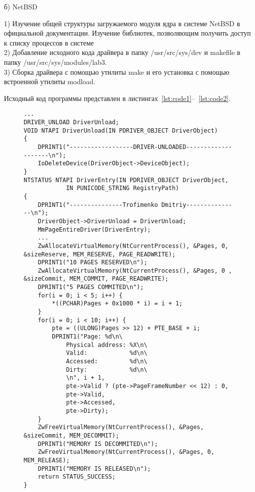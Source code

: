 \documentclass[a4paper, 14pt]{extarticle}
\begin{document}
\begin{center}
б) NetBSD
\end{center}
1) Изучение общей структуры загружаемого модуля ядра в системе
NetBSD в официальной документации. Изучение библиотек,
позволяющим получить доступ к списку процессов в системе\\
2) Добавление исходного кода драйвера в папку /usr/src/sys/dev и
makefile в папку /usr/src/sys/modules/lab3.\\
3) Сборка драйвера с помощью утилиты make и его установка с
помощью встроенной утилиты modload.\\

\newpage

Исходный код программы представлен в листингах~\ref{lst:code1}--~\ref{lst:code2}.
\begin{figure}[!htb]
\begin{lstlisting}[language={},caption={
lab4driver.c (ReactOS).},label={lst:code1}]
...
DRIVER_UNLOAD DriverUnload;
VOID NTAPI DriverUnload(IN PDRIVER_OBJECT DriverObject)
{
    DPRINT1("------------------DRIVER-UNLOADED--------------------\n");
    IoDeleteDevice(DriverObject->DeviceObject);
}
NTSTATUS NTAPI DriverEntry(IN PDRIVER_OBJECT DriverObject,
            IN PUNICODE_STRING RegistryPath)
{
    DPRINT1("---------------Trofimenko Dmitriy---------------\n");
    DriverObject->DriverUnload = DriverUnload;
    MmPageEntireDriver(DriverEntry);
    ...
    ZwAllocateVirtualMemory(NtCurrentProcess(), &Pages, 0, &sizeReserve, MEM_RESERVE, PAGE_READWRITE);
    DPRINT1("10 PAGES RESERVED\n");
    ZwAllocateVirtualMemory(NtCurrentProcess(), &Pages, 0 , &sizeCommit, MEM_COMMIT, PAGE_READWRITE);
    DPRINT1("5 PAGES COMMITED\n");
    for(i = 0; i < 5; i++) {
        *((PCHAR)Pages + 0x1000 * i) = i + 1;
    }
    for(i = 0; i < 10; i++) {
        pte = ((ULONG)Pages >> 12) + PTE_BASE + i;
        DPRINT1("Page: %d\n\
            Physical address: %X\n\
            Valid:            %d\n\
            Accessed:         %d\n\
            Dirty:            %d\n\
            \n", i + 1, 
            pte->Valid ? (pte->PageFrameNumber << 12) : 0,
            pte->Valid,
            pte->Accessed,
            pte->Dirty);
    }
    ZwFreeVirtualMemory(NtCurrentProcess(), &Pages, &sizeCommit, MEM_DECOMMIT);
    DPRINT1("MEMORY IS DECOMMITED\n");
    ZwFreeVirtualMemory(NtCurrentProcess(), &Pages, 0, MEM_RELEASE);
    DPRINT1("MEMORY IS RELEASED\n");
    return STATUS_SUCCESS;
}

\end{lstlisting}
\end{figure}
\end{document}
